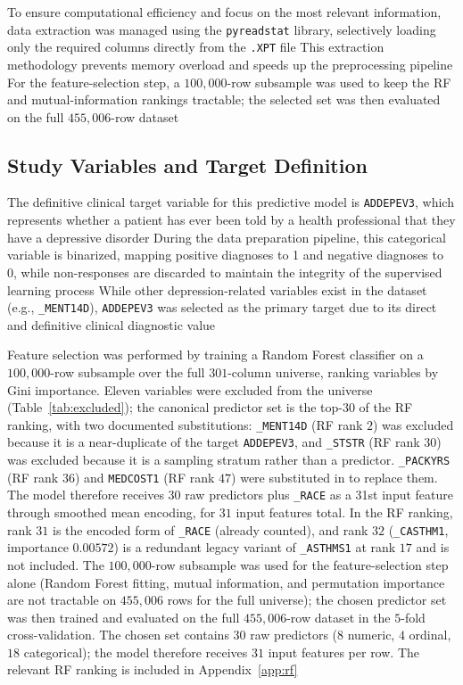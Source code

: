 \documentclass[conference]{IEEEtran}
\begin{document}
To ensure computational efficiency and focus on the most relevant information, data extraction was managed using the \texttt{pyreadstat} library, selectively loading only the required columns directly from the \texttt{.XPT} file %
This extraction methodology prevents memory overload and speeds up the preprocessing pipeline %
For the feature-selection step, a $100{,}000$-row subsample was used to keep the RF and mutual-information rankings tractable; the selected set was then evaluated on the full $455{,}006$-row dataset %

\subsection{Study Variables and Target Definition}

The definitive clinical target variable for this predictive model is \texttt{ADDEPEV3}, which represents whether a patient has ever been told by a health professional that they have a depressive disorder \cite{cdc2024brfss} %
During the data preparation pipeline, this categorical variable is binarized, mapping positive diagnoses to 1 and negative diagnoses to 0, while non-responses are discarded to maintain the integrity of the supervised learning process %
While other depression-related variables exist in the dataset (e.g., \texttt{\_MENT14D}), \texttt{ADDEPEV3} was selected as the primary target due to its direct and definitive clinical diagnostic value %

Feature selection was performed by training a Random Forest classifier on a $100{,}000$-row subsample over the full $301$-column universe, ranking variables by Gini importance. Eleven variables were excluded from the universe (Table~\ref{tab:excluded}); the canonical predictor set is the top-$30$ of the RF ranking, with two documented substitutions: \texttt{\_MENT14D} (RF rank $2$) was excluded because it is a near-duplicate of the target \texttt{ADDEPEV3}, and \texttt{\_STSTR} (RF rank $30$) was excluded because it is a sampling stratum rather than a predictor. \texttt{\_PACKYRS} (RF rank $36$) and \texttt{MEDCOST1} (RF rank $47$) were substituted in to replace them. The model therefore receives $30$ raw predictors plus \texttt{\_RACE} as a 31st input feature through smoothed mean encoding, for $31$ input features total. In the RF ranking, rank $31$ is the encoded form of \texttt{\_RACE} (already counted), and rank $32$ (\texttt{\_CASTHM1}, importance $0.00572$) is a redundant legacy variant of \texttt{\_ASTHMS1} at rank $17$ and is not included. The $100{,}000$-row subsample was used for the feature-selection step alone (Random Forest fitting, mutual information, and permutation importance are not tractable on $455{,}006$ rows for the full universe); the chosen predictor set was then trained and evaluated on the full $455{,}006$-row dataset in the $5$-fold cross-validation. The chosen set contains $30$ raw predictors ($8$ numeric, $4$ ordinal, $18$ categorical); the model therefore receives $31$ input features per row. The relevant RF ranking is included in Appendix~\ref{app:rf} %
\end{document}
